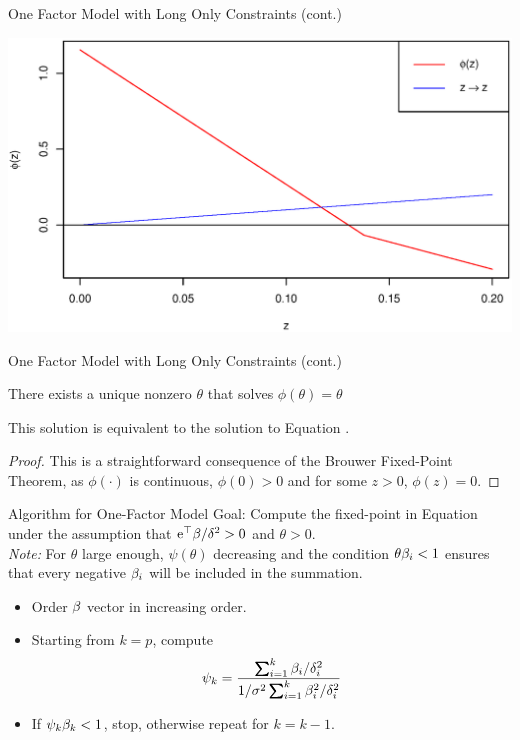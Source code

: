 \documentclass[11pt,leqno]{beamer}
\begin{document}
\begin{frame}{One Factor Model with Long Only Constraints (cont.)}
\begin{centering}
\includegraphics[scale=.5]{FP.eps}
\end{centering}
\end{frame}



\begin{frame}{One Factor Model with Long Only Constraints (cont.)}
\begin{theorem}
There exists a unique nonzero $\theta$ that solves $\phi(\theta)=\theta$
\end{theorem}
This solution is equivalent to the solution to Equation .
\begin{proof}
This is a straightforward consequence of the Brouwer Fixed-Point Theorem, as  $\phi(\cdot)$ is continuous, $\phi(0)>0$ and for some $z>0$, $\phi(z)=0$.
\end{proof}
\end{frame}

\begin{frame}{Algorithm for One-Factor Model}
Goal: Compute the fixed-point in Equation  under the assumption that $\mathrm{e}^\top \beta/\delta^2 >0$ and $\theta>0$.\\
\textit{Note:} For $\theta$ large enough, $\psi(\theta)$ decreasing and the condition $\theta \beta_i<1$ ensures that every negative $\beta_i$ will be included in the summation.
\begin{itemize}
\item Order $\beta$ vector in increasing order.
\item Starting from $k=p$, compute 
\begin{equation}
\psi_k = \frac{\sum_{i=1}^k\gb_i/\gd_i^2}{1/\gs^2 \sum_{i=1}^k \gb_i^2/\gd_i^2}
\end{equation}
\item If $\psi_k \beta_k < 1$, stop, otherwise repeat for $k=k-1$.
\end{itemize}
\end{frame}
\end{document}
